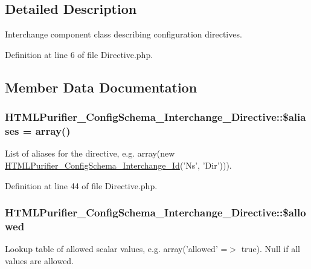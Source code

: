 \subsection{Detailed Description}
Interchange component class describing configuration directives. 

Definition at line 6 of file Directive.\+php.



\subsection{Member Data Documentation}
\hypertarget{classHTMLPurifier__ConfigSchema__Interchange__Directive_adcf03d73d17bb87e36b6d745b26d448c}{
\subsubsection[{\$aliases}]{\setlength{\rightskip}{0pt plus 5cm}H\+T\+M\+L\+Purifier\+\_\+\+Config\+Schema\+\_\+\+Interchange\+\_\+\+Directive\+::\$aliases = array()}}\label{classHTMLPurifier__ConfigSchema__Interchange__Directive_adcf03d73d17bb87e36b6d745b26d448c}
List of aliases for the directive, e.\+g. array(new \hyperlink{classHTMLPurifier__ConfigSchema__Interchange__Id}{H\+T\+M\+L\+Purifier\+\_\+\+Config\+Schema\+\_\+\+Interchange\+\_\+\+Id}('Ns', 'Dir'))). 

Definition at line 44 of file Directive.\+php.

\hypertarget{classHTMLPurifier__ConfigSchema__Interchange__Directive_a26ae514188fab0a906ac047821e7e89d}{
\subsubsection[{\$allowed}]{\setlength{\rightskip}{0pt plus 5cm}H\+T\+M\+L\+Purifier\+\_\+\+Config\+Schema\+\_\+\+Interchange\+\_\+\+Directive\+::\$allowed}}\label{classHTMLPurifier__ConfigSchema__Interchange__Directive_a26ae514188fab0a906ac047821e7e89d}
Lookup table of allowed scalar values, e.\+g. array('allowed' =$>$ true). Null if all values are allowed. 

